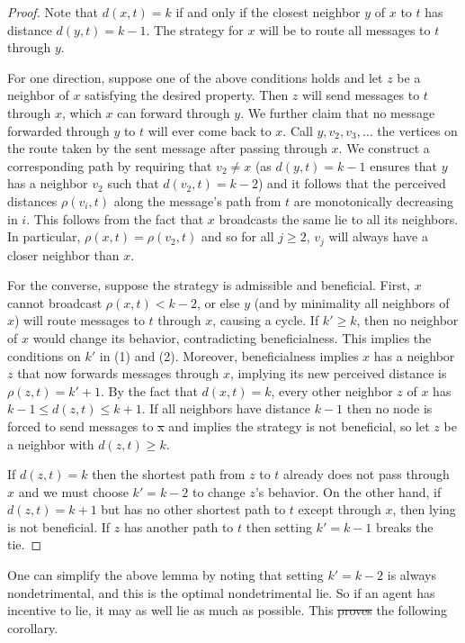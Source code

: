 \documentclass{comnet}
\providecommand{\DIFadd}[1]{{\protect\color{blue}\uwave{#1}}} %
\providecommand{\DIFdel}[1]{{\protect\color{red}\sout{#1}}}                      %
\providecommand{\DIFaddbegin}{} %
\providecommand{\DIFaddend}{} %
\providecommand{\DIFdelbegin}{} %
\providecommand{\DIFdelend}{} %
\begin{document}
\begin{proof}

Note that $d(x,t) = k$ if and only if the closest neighbor $y$ of $x$ to $t$
has distance $d(y,t) = k-1$. The strategy for $x$ will be to route all messages
to $t$ through $y$.

For one direction, suppose one of the above conditions holds and let $z$ be a
neighbor of $x$ satisfying the desired property. Then $z$ will send messages to
$t$ through $x$, which $x$ can forward through $y$. We further claim that no
message forwarded through $y$ to $t$ will ever come back to $x$. Call $y, v_2,
v_3, \dots$ the vertices on the route taken by the sent message after passing
through $x$. We construct a corresponding path by requiring that $v_2 \neq x$
(as $d(y,t)=k-1$ ensures that $y$ has a neighbor $v_{2}$ such that
$d(v_{2},t)=k-2$) and it follows that the perceived distances $\rho(v_i, t)$
along the message's path from $t$ are monotonically decreasing in $i$. This
follows from the fact that $x$ broadcasts the same lie to all its neighbors. In
particular, $\rho(x,t) = \rho(v_2, t)$ and so for all $j \geq 2$, $v_j$ will
always have a closer neighbor than $x$.

For the converse, suppose the strategy is admissible and beneficial. First, $x$
cannot broadcast $\rho(x,t) < k-2$, or else $y$ (and by minimality all
neighbors of $x$) will route messages to $t$ through $x$, causing a cycle. If
$k' \geq k$, then no neighbor of $x$ would change its behavior, contradicting
beneficialness. This implies the conditions on $k'$ in (1) and (2). Moreover,
beneficialness implies $x$ has a neighbor $z$ that now forwards messages
through $x$, implying its new perceived distance is $\rho(z,t) = k' + 1$. By
the fact that $d(x,t) = k$, every other neighbor $z$ of $x$ has $k-1 \leq
d(z,t) \leq k+1$. If all neighbors have distance $k-1$ then no node is forced
to send messages to \DIFdelbegin \DIFdel{x }\DIFdelend \DIFaddbegin \DIFadd{$x$ }\DIFaddend and implies the strategy is not beneficial, so let $z$
be a neighbor with $d(z,t) \geq k$.

If $d(z,t) = k$ then the shortest path from $z$ to $t$ already does not pass
through $x$ and we must choose $k' = k-2$ to change $z$'s behavior. On the
other hand, if $d(z,t) = k+1$ but has no other shortest path to $t$ except
through $x$, then lying is not beneficial. If $z$ has another
path to $t$ then setting $k' = k-1$ breaks the tie.
\end{proof}

One can simplify the above lemma by noting that setting $k' = k-2$ is always
nondetrimental, and this is the optimal nondetrimental lie. So if an agent has
incentive to lie, it may as well lie as much as possible. This \DIFdelbegin \DIFdel{proves }\DIFdelend \DIFaddbegin \DIFadd{motivates }\DIFaddend the
following corollary.
\end{document}
